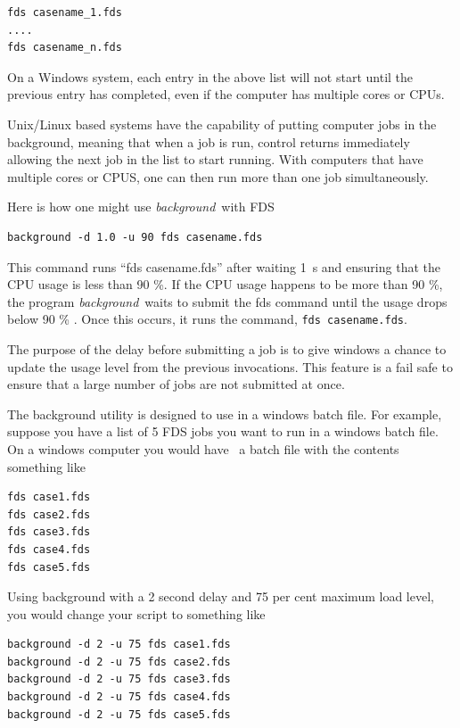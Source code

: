\documentclass[11pt,twoside]{book}
\begin{document}
\begin{lstlisting}
fds casename_1.fds
....
fds casename_n.fds
\end{lstlisting}

On a Windows system, each entry in the above list will not start until the previous entry
has completed, even if the computer has multiple cores or CPUs.

Unix/Linux based systems have the capability of putting computer jobs in the background,
meaning that when a job is run, control returns immediately allowing the next job in the
list to start running.  With computers that have multiple cores or CPUS, one can then run
more than one job simultaneously.

Here is how one might use {\em background}\ with FDS

\begin{lstlisting}
background -d 1.0 -u 90 fds casename.fds
\end{lstlisting}

This command runs ``fds casename.fds'' after waiting 1~s and ensuring that the CPU usage is
less than 90 \%. If the CPU usage happens to be more than 90 \%, the program {\em background}\
waits to submit the fds command until the usage drops below 90 \% .  Once this occurs, it runs
the command, {\tt fds casename.fds}.

The purpose of the delay before submitting a job is to give windows a chance to update the usage level from the
previous invocations.  This feature is a fail safe to ensure that a large number of jobs are not
submitted at once.

The background utility is designed to use in a windows batch file. For example, suppose you have
a list of 5 FDS jobs you want to run in a windows batch file. On a windows computer you would have \
a batch file with the contents something like

\begin{lstlisting}
fds case1.fds
fds case2.fds
fds case3.fds
fds case4.fds
fds case5.fds
\end{lstlisting}

Using background with a 2 second delay and 75 per cent maximum load level, you would change your script to something like

\begin{lstlisting}
background -d 2 -u 75 fds case1.fds
background -d 2 -u 75 fds case2.fds
background -d 2 -u 75 fds case3.fds
background -d 2 -u 75 fds case4.fds
background -d 2 -u 75 fds case5.fds
\end{lstlisting}
\end{document}
